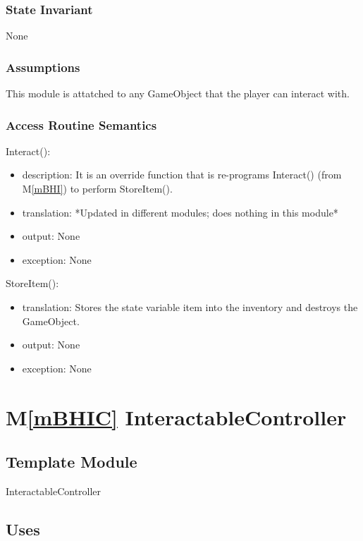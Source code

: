 \documentclass[12pt]{article}
\newcommand{\mref}[1]{M\ref{#1}}
\begin{document}
\subsubsection* {State Invariant}

None

\subsubsection* {Assumptions}

This module is attatched to any GameObject that the player can interact with. 

\newpage

\subsubsection* {Access Routine Semantics}

\noindent Interact():
\begin{itemize}
\item description: It is an override function that is re-programs Interact() (from \mref{mBHI}) to perform StoreItem().
\item translation: *Updated in different modules; does nothing in this module*
\item output: None
\item exception: None
\end{itemize}

\noindent StoreItem():
\begin{itemize}
\item translation: Stores the state variable item into the inventory and destroys the GameObject.
\item output: None
\item exception: None
\end{itemize}

\newpage

\section* {\mref{mBHIC} InteractableController}

\subsection*{Template Module}

InteractableController

\subsection* {Uses}
\end{document}
